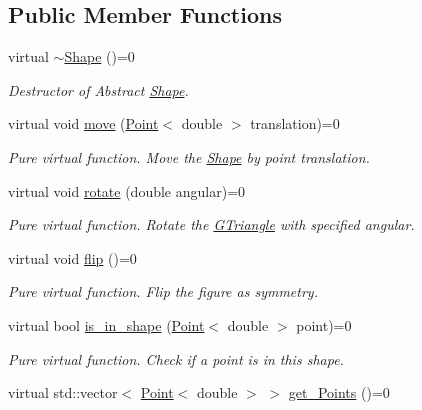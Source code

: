 \subsection*{Public Member Functions}
\begin{DoxyCompactItemize}
\item 
\mbox{\label{classShape_a39fe45638d872f0ce9670d7f85290161}} 
virtual \hyperlink{classShape_a39fe45638d872f0ce9670d7f85290161}{$\sim$\+Shape} ()=0
\begin{DoxyCompactList}\small\item\em Destructor of Abstract \hyperlink{classShape}{Shape}. \end{DoxyCompactList}\item 
virtual void \hyperlink{classShape_a52649731b2cb7b67315882d5e005f7e8}{move} (\hyperlink{classPoint}{Point}$<$ double $>$ translation)=0
\begin{DoxyCompactList}\small\item\em Pure virtual function. Move the \hyperlink{classShape}{Shape} by point translation. \end{DoxyCompactList}\item 
virtual void \hyperlink{classShape_a2dea8616fd40f2d69fd208715921982a}{rotate} (double angular)=0
\begin{DoxyCompactList}\small\item\em Pure virtual function. Rotate the \hyperlink{classGTriangle}{G\+Triangle} with specified angular. \end{DoxyCompactList}\item 
\mbox{\label{classShape_a5a1607f7dc4908225f97aeadb449636d}} 
virtual void \hyperlink{classShape_a5a1607f7dc4908225f97aeadb449636d}{flip} ()=0
\begin{DoxyCompactList}\small\item\em Pure virtual function. Flip the figure as symmetry. \end{DoxyCompactList}\item 
virtual bool \hyperlink{classShape_abcce23128cd35989468a88a7194152af}{is\+\_\+in\+\_\+shape} (\hyperlink{classPoint}{Point}$<$ double $>$ point)=0
\begin{DoxyCompactList}\small\item\em Pure virtual function. Check if a point is in this shape. \end{DoxyCompactList}\item 
virtual std\+::vector$<$ \hyperlink{classPoint}{Point}$<$ double $>$ $>$ \hyperlink{classShape_add74a5c682840fa4a519242b1ddbd0b5}{get\+\_\+\+Points} ()=0

\end{DoxyCompactItemize}
